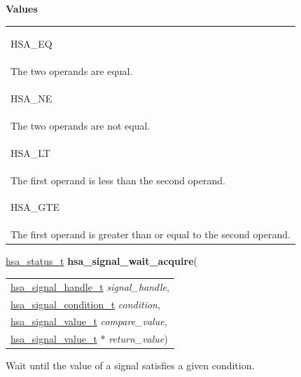 \documentclass[final]{book}
\newcommand{\hsaarg}[1]{\textit{#1}}
\newcommand{\reftyp}[1]{#1}
\newcommand{\refenu}[1]{\reftyp{#1}}
\begin{document}
\noindent\textbf{Values}\\[-5mm]
\begin{longtable}{@{\hspace{2em}}p{\linewidth-2em}}
\hspace{-2em}\hypertarget{group__signals_1ggab7190fcff48c6dbeded341389ed17c8daad3556497ba9c0d287d42345baba25d6}{\refenu{HSA_EQ}} \\The two operands are equal.\\[2mm]
\hspace{-2em}\hypertarget{group__signals_1ggab7190fcff48c6dbeded341389ed17c8dae595f91b4c0720a4741c6fe4ead6f793}{\refenu{HSA_NE}} \\The two operands are not equal.\\[2mm]
\hspace{-2em}\hypertarget{group__signals_1ggab7190fcff48c6dbeded341389ed17c8da02c24632d8b8925649d95f4221b40e15}{\refenu{HSA_LT}} \\The first operand is less than the second operand.\\[2mm]
\hspace{-2em}\hypertarget{group__signals_1ggab7190fcff48c6dbeded341389ed17c8da8f171d683f208e4e9794b89f40998547}{\refenu{HSA_GTE}} \\The first operand is greater than or equal to the second operand.
\end{longtable}

\noindent\begin{tcolorbox}[breakable,nobeforeafter,colframe=white,colback=lightgray,left=0mm]
\hyperlink{group__status_1gad755322e7ff95456520e8abdbe90d225}{hsa_status_t} \hypertarget{group__signals_1ga882725c4930673915c174bb5dd56cb23}{\textbf{hsa_signal_wait_acquire}}(
\vspace{-3.5mm}\begin{longtable}{@{}p{\textwidth}}
\hspace{1.7em}\hyperlink{group__signals_1ga6592c136d70853d855bc11d9efdbf534}{hsa_signal_handle_t} \hsaarg{signal_handle},\\
\hspace{1.7em}\hyperlink{group__signals_1gab7190fcff48c6dbeded341389ed17c8d}{hsa_signal_condition_t} \hsaarg{condition},\\
\hspace{1.7em}\hyperlink{group__signals_1gacdf7a070a2f988bcf97904a1f5d0e573}{hsa_signal_value_t} \hsaarg{compare_value},\\
\hspace{1.7em}\hyperlink{group__signals_1gacdf7a070a2f988bcf97904a1f5d0e573}{hsa_signal_value_t} * \hsaarg{return_value})\end{longtable}

\end{tcolorbox}
Wait until the value of a signal satisfies a given condition.
\end{document}

